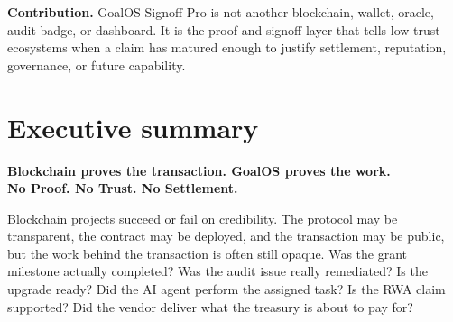 \documentclass[11pt]{article}
\newcommand{\Signoff}{GoalOS Signoff Pro}
\begin{document}
\newpage
\begin{abstract}
Blockchains provide programmable settlement, public state, and tamper-resistant transaction history. They do not, by themselves, prove that the off-chain work behind a transaction was real, complete, independently reviewed, risk-bounded, or worthy of payment. This paper formalizes that missing layer as the \emph{work-verification gap}. We propose \Signoff{} as a proof-to-acceptance and proof-to-settlement architecture for blockchain credibility: a system that converts work claims into mission contracts, evidence dockets, proof bundles, replay logs, validator reports, risk ledgers, human-authority decisions, signed receipts, challenge windows, and optional public anchors. The paper provides a formal object model, lifecycle state machine, acceptance predicate, settlement-safety invariant, threat model, claim-maturity lattice, due-diligence scorecard, and adoption roadmap. It also specifies two flagship public demonstrations: v28, the Blockchain Credibility Standard Lab, and v29, the Blockchain Proof Mandate and Due Diligence Lab. The result is a concise institutional standard: \emph{Blockchain proves the transaction; GoalOS proves the work.} Therefore, for serious blockchain projects: \emph{No Proof. No Trust. No Settlement.}
\end{abstract}

\begin{thesisbox}
\textbf{Contribution.} \Signoff{} is not another blockchain, wallet, oracle, audit badge, or dashboard. It is the proof-and-signoff layer that tells low-trust ecosystems when a claim has matured enough to justify settlement, reputation, governance, or future capability.
\end{thesisbox}

\tableofcontents
\newpage
{}

\section{Executive summary}

\begin{standardbox}
\begin{center}
{\Large\bfseries Blockchain proves the transaction. GoalOS proves the work.}\\[4pt]
{\large\bfseries No Proof. No Trust. No Settlement.}
\end{center}
\end{standardbox}

Blockchain projects succeed or fail on credibility. The protocol may be transparent, the contract may be deployed, and the transaction may be public, but the work behind the transaction is often still opaque. Was the grant milestone actually completed? Was the audit issue really remediated? Is the upgrade ready? Did the AI agent perform the assigned task? Is the RWA claim supported? Did the vendor deliver what the treasury is about to pay for?
\end{document}
